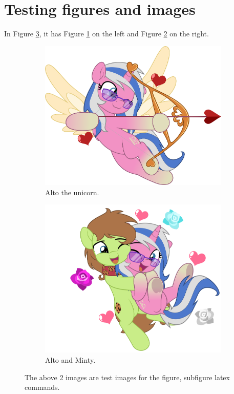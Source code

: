 \documentclass[12pt]{article}
\begin{document}
\section{Testing figures and images}
    In Figure \ref{fig:two-test-figures}, it has Figure \ref{fig:two-test-fig-1} on the left and Figure \ref{fig:two-test-fig-2} on the right. 
    \begin{figure}[H]
        \begin{subfigure}[b]{0.47\textwidth}
            \centering
            \includegraphics[width=\textwidth]{assets/test-image-1.png}
            \caption{Alto the unicorn. }
            \label{fig:two-test-fig-1}
        \end{subfigure}
        \hfill
        \begin{subfigure}[b]{0.47\textwidth}
            \centering
            \includegraphics[width=\textwidth]{assets/test-image-2.png}
            \caption{Alto and Minty. }
            \label{fig:two-test-fig-2}
        \end{subfigure}
        \caption{The above 2 images are test images for the figure, subfigure latex commands. }
    \label{fig:two-test-figures}
    \end{figure}
\end{document}
